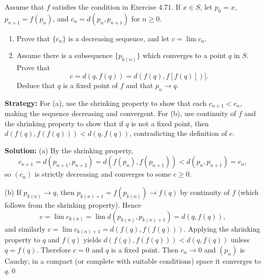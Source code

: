 \begin{problembox}
Assume that $f$ satisfies the condition in Exercise 4.71. If $x \in S$, let $p_0 = x$, $p_{n+1} = f(p_n)$, and $c_n = d(p_n, p_{n+1})$ for $n \geq 0$.
\begin{enumerate}[label=(\alph*)]
\item Prove that $\{c_n\}$ is a decreasing sequence, and let $c = \lim c_n$.
\item Assume there is a subsequence $\{p_{k(n)}\}$ which converges to a point $q$ in $S$. Prove that
\[c = d(q, f(q)) = d(f(q), f[f(q)])].\]
Deduce that $q$ is a fixed point of $f$ and that $p_n \to q$.
\end{enumerate}
\end{problembox}

\noindent\textbf{Strategy:} For (a), use the shrinking property to show that each $c_{n+1} < c_n$, making the sequence decreasing and convergent. For (b), use continuity of $f$ and the shrinking property to show that if $q$ is not a fixed point, then $d(f(q), f(f(q))) < d(q, f(q))$, contradicting the definition of $c$.

\bigskip\noindent\textbf{Solution:}
(a) By the shrinking property,
\[
c_{n+1}=d(p_{n+1},p_{n+2})=d(f(p_n),f(p_{n+1}))<d(p_n,p_{n+1})=c_n,
\]
so $(c_n)$ is strictly decreasing and converges to some $c\ge 0$.

(b) If $p_{k(n)}\to q$, then $p_{k(n)+1}=f(p_{k(n)})\to f(q)$ by continuity of $f$ (which follows from the shrinking property). Hence
\[
c=\lim c_{k(n)}=\lim d(p_{k(n)},p_{k(n)+1})=d(q,f(q)),
\]
and similarly $c=\lim c_{k(n)+1}=d(f(q),f(f(q)))$. Applying the shrinking property to $q$ and $f(q)$ yields $d(f(q),f(f(q)))<d(q,f(q))$ unless $q=f(q)$. Therefore $c=0$ and $q$ is a fixed point. Then $c_n\to 0$ and $(p_n)$ is Cauchy; in a compact (or complete with suitable conditions) space it converges to $q$.\qed
